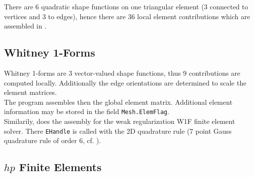 
 There are 6 quadratic shape functions on one triangular element (3 connected to vertices and 3 to edges), hence there are 36 local element contributions which are assembled in .




\subsection{Whitney 1-Forms} 

 Whitney 1-forms are 3 vector-valued shape functions, thus 9 contributions are computed locally. Additionally the edge orientations are determined to scale the element matrices. \\

 The program  assembles then the global element matrix. Additional element information may be stored in the field {\tt Mesh.ElemFlag}. \\


Similarily,  does the assembly for the weak regularization W1F finite element solver. There {\tt EHandle} is called with the 2D quadrature rule  (7 point Gauss quadrature rule of order 6, cf. \pageref{ssect:quad_po}).



\subsection{$hp$ Finite Elements} \label{ssec:asseMathp} 


